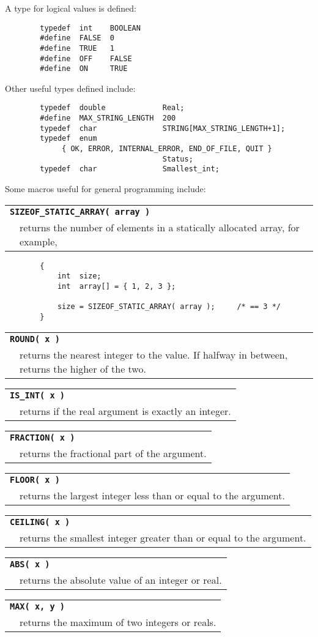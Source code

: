 A type for logical values is defined:
{\bf\begin{verbatim}
        typedef  int    BOOLEAN
        #define  FALSE  0
        #define  TRUE   1
        #define  OFF    FALSE
        #define  ON     TRUE
\end{verbatim}}

Other useful types defined include:
{\bf\begin{verbatim}
        typedef  double             Real;
        #define  MAX_STRING_LENGTH  200
        typedef  char               STRING[MAX_STRING_LENGTH+1];
        typedef  enum 
             { OK, ERROR, INTERNAL_ERROR, END_OF_FILE, QUIT }
                                    Status;
        typedef  char               Smallest_int;
\end{verbatim}}

\newcommand{\definemacro}[2]{
\begin{tabular}{p{2cm}p{10cm}}
\multicolumn{2}{l}{{\bf\tt #1}} \\
& #2 \\
\end{tabular}}

Some macros useful for general programming include:

\definemacro{SIZEOF\_STATIC\_ARRAY( array )}
{returns the number of elements in a statically allocated array, for example,}
{\bf\begin{verbatim}
        {
            int  size;
            int  array[] = { 1, 2, 3 };

            size = SIZEOF_STATIC_ARRAY( array );     /* == 3 */
        }
\end{verbatim}}

\definemacro{ROUND( x )}{returns the nearest integer to the value.  If
halfway in between, returns the higher of the two.}

\definemacro{IS\_INT( x )}{returns \name{TRUE} if the real argument is exactly an integer.}

\definemacro{FRACTION( x )}{returns the fractional part of the argument.}

\definemacro{FLOOR( x )}{returns the largest integer less than or
equal to the argument.}

\definemacro{CEILING( x )}{returns the smallest integer greater than or
equal to the argument.}

\definemacro{ABS( x )}{returns the absolute value of an integer or real.}

\definemacro{MAX( x, y )}{returns the maximum of two integers or reals.}

